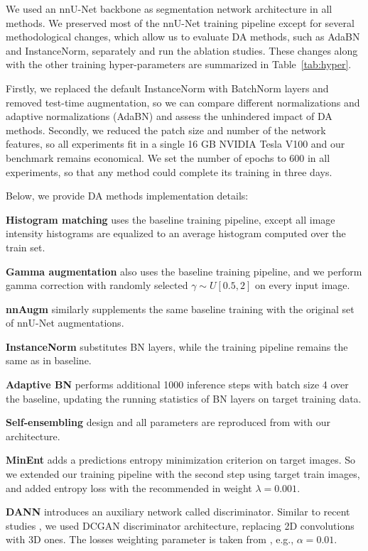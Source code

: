 We used an nnU-Net \cite{nnunet} backbone as segmentation network architecture in all methods. We preserved most of the nnU-Net training pipeline except for several methodological changes, which allow us to evaluate DA methods, such as AdaBN and InstanceNorm, separately and run the ablation studies. These changes along with the other training hyper-parameters are summarized in Table~\ref{tab:hyper}.

Firstly, we replaced the default InstanceNorm with BatchNorm layers and removed test-time augmentation, so we can compare different normalizations and adaptive normalizations (AdaBN) and assess the unhindered impact of DA methods. Secondly, we reduced the patch size and number of the network features, so all experiments fit in a single 16 GB NVIDIA Tesla V100 and our benchmark remains economical. We set the number of epochs to 600 in all experiments, so that any method could complete its training in three days.

Below, we provide DA methods implementation details:


\textbf{Histogram matching} uses the baseline training pipeline, except all image intensity histograms are equalized to an average histogram computed over the train set. 


\textbf{Gamma augmentation} also uses the baseline training pipeline, and we perform gamma correction with randomly selected $\gamma \sim U[0.5, 2]$ on every input image.


\textbf{nnAugm} similarly supplements the same baseline training with the original set of nnU-Net \cite{nnunet} augmentations.


\textbf{InstanceNorm} substitutes BN layers, while the training pipeline remains the same as in baseline.


\textbf{Adaptive BN} performs additional 1000 inference steps with batch size 4 over the baseline, updating the running statistics of BN layers on target training data.


\textbf{Self-ensembling} design and all parameters are reproduced from \cite{se_medim} with our architecture.


\textbf{MinEnt} adds a predictions entropy minimization criterion on target images. So we extended our training pipeline with the second step using target train images, and added entropy loss with the recommended in \cite{entropy} weight $\lambda = 0.001$.


\textbf{DANN} introduces an auxiliary network called discriminator. Similar to recent studies \cite{entropy}, we used DCGAN \cite{dcgan} discriminator architecture, replacing 2D convolutions with 3D ones. The losses weighting parameter is taken from \cite{dann_medim}, e.g., $\alpha = 0.01$.


